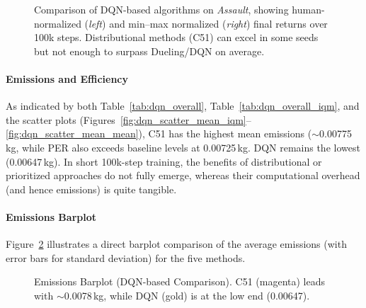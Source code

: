 \begin{figure}
	\centering
	\quad
	\caption{Comparison of DQN-based algorithms on \textit{Assault}, 
		showing human-normalized (\textit{left}) and min--max normalized (\textit{right}) 
		final returns over 100k steps. 
		Distributional methods (C51) can excel in some seeds but not enough to surpass Dueling/DQN on average.}
	\label{fig:assault_comparison}
\end{figure}

\paragraph{Emissions and Efficiency}
As indicated by both Table~\ref{tab:dqn_overall}, Table~\ref{tab:dqn_overall_iqm}, 
and the scatter plots (Figures~\ref{fig:dqn_scatter_mean_iqm}--\ref{fig:dqn_scatter_mean_mean}), 
C51 has the highest mean emissions ($\sim$\num{0.00775}\,kg, 
while PER also exceeds baseline levels at \num{0.00725}\,kg. 
DQN remains the lowest (\num{0.00647}\,kg). 
In short 100k-step training, the benefits of distributional or prioritized approaches 
do not fully emerge, whereas their computational overhead (and hence emissions) is quite tangible.

\paragraph{Emissions Barplot}

Figure~\ref{fig:dqn_comp_emissions_bar} illustrates a direct barplot comparison
of the average emissions (with error bars for standard deviation) for the five methods.
\begin{figure}
	\centering
	
	\caption{Emissions Barplot (DQN-based Comparison). 
		C51 (magenta) leads with $\sim$\num{0.0078}\,kg, while DQN (gold) is at the low end (\num{0.00647}).}
	\label{fig:dqn_comp_emissions_bar}
\end{figure}

